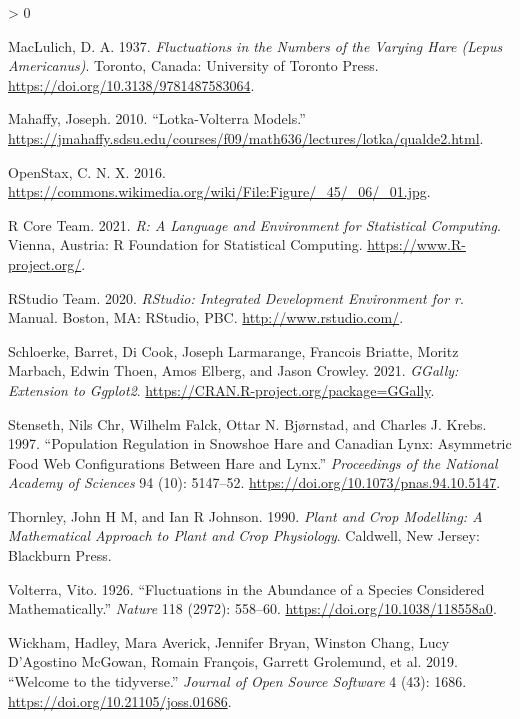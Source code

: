 \documentclass[
]{krantz}
\newlength{\cslhangindent}
\newenvironment{CSLReferences}[2] %
 {%
  \setlength{\parindent}{0pt}
  \ifodd #1 \everypar{\setlength{\hangindent}{\cslhangindent}}\ignorespaces\fi
  \ifnum #2 > 0
  \setlength{\parskip}{#2\baselineskip}
  \fi
 }%
 {}
\theoremstyle{definition}
\theoremstyle{definition}
\theoremstyle{definition}
\theoremstyle{definition}
\theoremstyle{remark}
\begin{document}
\begin{CSLReferences}{1}{0}
\leavevmode\hypertarget{ref-maclulich_fluctuations_1937}{}%
MacLulich, D. A. 1937. \emph{Fluctuations in the {Numbers} of the {Varying Hare} ({Lepus Americanus})}. Toronto, Canada: {University of Toronto Press}. \url{https://doi.org/10.3138/9781487583064}.

\leavevmode\hypertarget{ref-mahaffy_lotka-volterra_2010}{}%
Mahaffy, Joseph. 2010. {``Lotka-{Volterra Models}.''} \url{https://jmahaffy.sdsu.edu/courses/f09/math636/lectures/lotka/qualde2.html}.

\leavevmode\hypertarget{ref-openstax_notitle_2016}{}%
OpenStax, C. N. X. 2016. \url{https://commons.wikimedia.org/wiki/File:Figure/_45/_06/_01.jpg}.

\leavevmode\hypertarget{ref-R-base}{}%
R Core Team. 2021. \emph{R: A Language and Environment for Statistical Computing}. Vienna, Austria: R Foundation for Statistical Computing. \url{https://www.R-project.org/}.

\leavevmode\hypertarget{ref-rstudio_team_rstudio_2020}{}%
RStudio Team. 2020. \emph{{RStudio}: {Integrated} Development Environment for r}. Manual. {Boston, MA}: {RStudio, PBC}. \url{http://www.rstudio.com/}.

\leavevmode\hypertarget{ref-R-GGally}{}%
Schloerke, Barret, Di Cook, Joseph Larmarange, Francois Briatte, Moritz Marbach, Edwin Thoen, Amos Elberg, and Jason Crowley. 2021. \emph{GGally: Extension to Ggplot2}. \url{https://CRAN.R-project.org/package=GGally}.

\leavevmode\hypertarget{ref-stenseth_population_1997}{}%
Stenseth, Nils Chr, Wilhelm Falck, Ottar N. Bjørnstad, and Charles J. Krebs. 1997. {``Population Regulation in Snowshoe Hare and {Canadian} Lynx: {Asymmetric} Food Web Configurations Between Hare and Lynx.''} \emph{Proceedings of the National Academy of Sciences} 94 (10): 5147--52. \url{https://doi.org/10.1073/pnas.94.10.5147}.

\leavevmode\hypertarget{ref-thornley_plant_1990}{}%
Thornley, John H M, and Ian R Johnson. 1990. \emph{Plant and {Crop Modelling}: {A Mathematical Approach} to {Plant} and {Crop Physiology}}. Caldwell, New Jersey: {Blackburn Press}.

\leavevmode\hypertarget{ref-volterra_fluctuations_1926}{}%
Volterra, Vito. 1926. {``Fluctuations in the {Abundance} of a {Species} Considered {Mathematically}.''} \emph{Nature} 118 (2972): 558--60. \url{https://doi.org/10.1038/118558a0}.

\leavevmode\hypertarget{ref-tidyverse2019}{}%
Wickham, Hadley, Mara Averick, Jennifer Bryan, Winston Chang, Lucy D'Agostino McGowan, Romain François, Garrett Grolemund, et al. 2019. {``Welcome to the {tidyverse}.''} \emph{Journal of Open Source Software} 4 (43): 1686. \url{https://doi.org/10.21105/joss.01686}.

\end{CSLReferences}

\backmatter
\printindex
\end{document}
